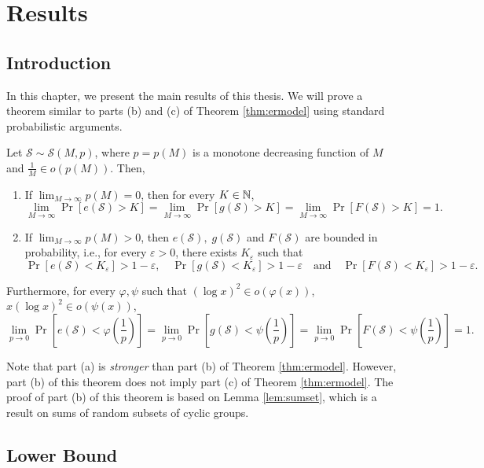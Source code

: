 \chapter{Results}\label{chap:results}


\section{Introduction}  

In this chapter, we present the main results of this thesis. We will prove a theorem similar to parts (b) and (c) of Theorem \ref{thm:ermodel} using standard probabilistic arguments. 

\begin{theorem}\label{thm:main}
    Let $\mathcal{S} \sim \mathcal{S}(M, p)$, where $p = p(M)$ is a monotone decreasing function of $M$ and $\frac{1}{M} \in o(p(M))$. Then, 
\begin{enumerate}[label=(\alph*)]
    \item If $\lim_{M \to \infty} p(M) = 0$, then for every $K \in \mathbb{N}$,   
    \[\lim_{M \to \infty} \Pr[e(\mathcal{S}) > K] = \lim_{M \to \infty} \Pr[g(\mathcal{S}) > K] = \lim_{M \to \infty} \Pr[F(\mathcal{S}) > K] = 1.\]
    \item If $\lim_{M \to \infty} p(M) > 0$, then $e(\mathcal{S}), \; g(\mathcal{S})$ and $F(\mathcal{S})$ are bounded in probability, i.e., for every $\varepsilon > 0$, there exists $K_\varepsilon$ such that 
    \[ \Pr[e(\mathcal{S}) < K_\varepsilon] > 1 - \varepsilon, \quad  \Pr[g(\mathcal{S}) < K_\varepsilon] > 1- \varepsilon \quad \text{and} \quad \Pr[F(\mathcal{S}) < K_\varepsilon] > 1 - \varepsilon.\]
\end{enumerate}
Furthermore, for every $\varphi, \psi$ such that $(\log x)^2 \in o(\varphi(x))$, $x(\log x)^2 \in o(\psi(x))$,
\[\lim_{p \to 0} \Pr\left[e(\mathcal{S}) < \varphi\left(\frac{1}{p}\right)\right] = \lim_{p \to 0} \Pr\left[g(\mathcal{S}) < \psi\left(\frac{1}{p}\right)\right]  = \lim_{p \to 0} \Pr\left[F(\mathcal{S}) < \psi\left(\frac{1}{p}\right)\right] = 1.\]
\end{theorem}
Note that part (a) is \textit{stronger} than part (b) of Theorem \ref{thm:ermodel}. However, part (b) of this theorem does not imply part (c) of Theorem \ref{thm:ermodel}. The proof of part (b) of this theorem is based on Lemma \ref{lem:sumset}, which is a result on sums of random subsets of cyclic groups.  

\section{Lower Bound}\label{sec:results:lowerbound}

